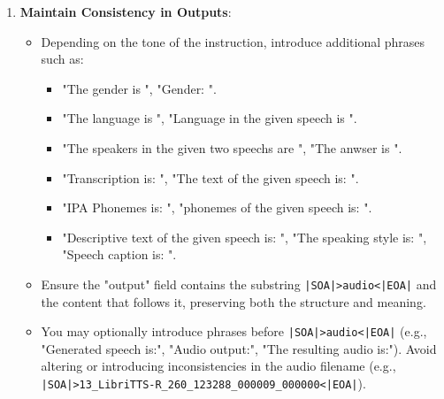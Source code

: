 \begin{tcolorbox}[
    colframe=black,  %
    colback=white,   %
    boxrule=0.5mm,    %
    arc=0mm,          %
    sharp corners,     %
    breakable
]
\begin{enumerate}
    \begin{itemize}
        \item  Change the labels for fields like "text:"`, "text\_description:"`, "audio:"`, "speaker\_audio:"`, "audio\_sample1"`, "audio\_sample2"` etc., according to "instruction", while retaining their original meaning. Examples include:
        \begin{itemize}
            \item "text:" to "spoken text," "speech input," "text excerpt," etc.
            \item "text\_description:" to "voice style," "descriptive text," "tone characteristics," etc.
            \item "audio:" to "source audio," "reference speech," "given recording," etc.
            \item "speaker\_audio:" to "speaker prompt," "reference voice," "voice sample," etc.
            \end{itemize}
        \item Ensure that the content following "text:" remains semantically identical to the original. The content following each label should remain unchanged, with only the labels varying.
    \end{itemize}

    \item \textbf{Maintain Consistency in Outputs}:
    \begin{itemize}
        \item Depending on the tone of the instruction, introduce additional phrases such as:
        \begin{itemize}
            \item "The gender is ", "Gender: ".
            \item "The language is ", "Language in the given speech is ".
            \item "The speakers in the given two speechs are ", "The anwser is ".
            \item "Transcription is: ", "The text of the given speech is: ".
            \item "IPA Phonemes is: ", "phonemes of the given speech is: ".
            \item "Descriptive text of the given speech is: ", "The speaking style is: ", "Speech caption is: ".
        \end{itemize}
        \item Ensure the "output" field contains the substring \texttt{|SOA|>audio<|EOA|} and the content that follows it, preserving both the structure and meaning.         \item You may optionally introduce phrases before \texttt{|SOA|>audio<|EOA|} (e.g., "Generated speech is:", "Audio output:", "The resulting audio is:"). Avoid altering or introducing inconsistencies in the audio filename (e.g., \texttt{|SOA|>13\_LibriTTS-R\_260\_123288\_000009\_000000<|EOA|}).
    \end{itemize}


\end{enumerate}
\end{tcolorbox}
